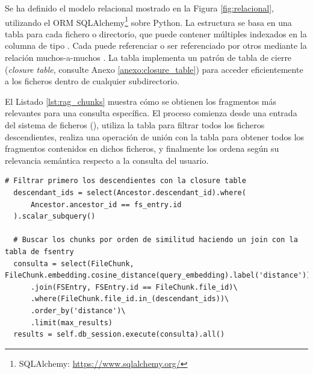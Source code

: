 Se ha definido el modelo relacional mostrado en la Figura \ref{fig:relacional}, utilizando el ORM SQLAlchemy\footnote{SQLAlchemy: \url{https://www.sqlalchemy.org/}} sobre Python. La estructura se basa en una tabla  para cada fichero o directorio, que puede contener múltiples  indexados en la columna  de tipo . Cada  puede referenciar o ser referenciado por otros  mediante la relación muchos-a-muchos . La tabla  implementa un patrón de tabla de cierre (\textit{closure table}, consulte Anexo \ref{anexo:closure_table}) para acceder eficientemente a los ficheros dentro de cualquier subdirectorio.

El Listado \ref{lst:rag_chunks} muestra cómo se obtienen los fragmentos más relevantes para una consulta específica. El proceso comienza desde una entrada del sistema de ficheros (), utiliza la tabla  para filtrar todos los ficheros descendientes, realiza una operación de unión con la tabla  para obtener todos los fragmentos contenidos en dichos ficheros, y finalmente los ordena según su relevancia semántica respecto a la consulta del usuario.

\begin{lstlisting}[caption={Obtener chunks relevantes para una consulta dentro de un subdirectorio específico}, label={lst:rag_chunks}]
  # Filtrar primero los descendientes con la closure table
  descendant_ids = select(Ancestor.descendant_id).where(
      Ancestor.ancestor_id == fs_entry.id
  ).scalar_subquery()

  # Buscar los chunks por orden de similitud haciendo un join con la tabla de fsentry
  consulta = select(FileChunk, FileChunk.embedding.cosine_distance(query_embedding).label('distance'))\
      .join(FSEntry, FSEntry.id == FileChunk.file_id)\
      .where(FileChunk.file_id.in_(descendant_ids))\
      .order_by('distance')\
      .limit(max_results)
  results = self.db_session.execute(consulta).all()
\end{lstlisting}


